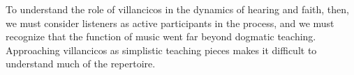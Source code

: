 



To understand the role of villancicos in the dynamics of hearing and faith,
then, we must consider listeners as active participants in the process, and we
must recognize that the function of music went far beyond dogmatic teaching.
Approaching villancicos as simplistic teaching pieces makes it difficult to
understand much of the repertoire.





 
